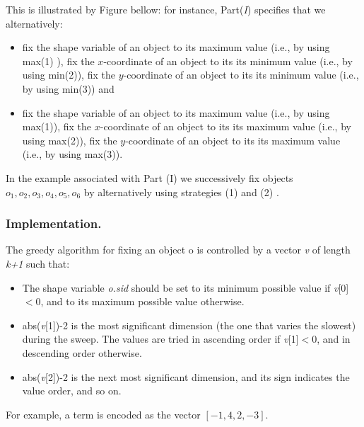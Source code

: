 This is illustrated by Figure bellow: for instance, Part(\emph{I}) specifies that we alternatively:
\begin{itemize}
	\item fix the shape variable of an object to its maximum value (i.e., by using max(1) ), fix the $x$-coordinate of an object to its its minimum value (i.e., by using min(2)), fix the $y$-coordinate of an object to its its minimum value (i.e., by using min(3)) and
	\item fix the shape variable of an object to its maximum value (i.e., by using max(1)), fix the $x$-coordinate of an object to its its maximum value (i.e., by using max(2)), fix the $y$-coordinate of an object to its its maximum value (i.e., by using max(3)).
\end{itemize}

In the example associated with Part (I) we successively fix objects $o_1, o_2, o_3, o_4, o_5, o_6$ by alternatively using strategies (1)  and (2) \mylst{object(_,max(1),x[max(2),max(3))}. 


\subsubsection{Implementation.}\label{geostdescription:implementation}\hypertarget{geostdescription:implementation}{}
The greedy algorithm for fixing an object o is controlled by a vector \emph{v} of length \emph{k+1} such that:
\begin{itemize}
	\item The shape variable \emph{o.sid} should be set to its minimum possible value if \emph{v}[0]$<0$, and to its maximum possible value otherwise.
	\item abs(\emph{v}[1])-2 is the most significant dimension (the one that varies the slowest) during the sweep. The values are tried in ascending order if \emph{v}[1]$<0$, and in descending order otherwise.
	\item abs(\emph{v}[2])-2 is the next most significant dimension, and its sign indicates the value order, and so on.
\end{itemize}

For example, a term  is encoded as the vector $[-1,4,2,-3]$.
	                                      
